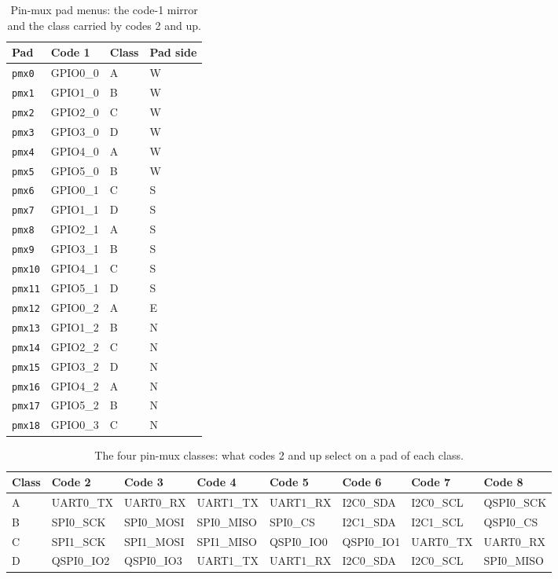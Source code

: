 \begin{table}[htbp]
	\centering
	\caption{Pin-mux pad menus: the code-1 mirror and the class carried by codes 2 and up.}
	\begin{tabular}{llll}
		\toprule
		Pad & Code 1 & Class & Pad side \\
		\midrule
		\texttt{pmx0} & GPIO0\_0 & A & W \\
		\texttt{pmx1} & GPIO1\_0 & B & W \\
		\texttt{pmx2} & GPIO2\_0 & C & W \\
		\texttt{pmx3} & GPIO3\_0 & D & W \\
		\texttt{pmx4} & GPIO4\_0 & A & W \\
		\texttt{pmx5} & GPIO5\_0 & B & W \\
		\texttt{pmx6} & GPIO0\_1 & C & S \\
		\texttt{pmx7} & GPIO1\_1 & D & S \\
		\texttt{pmx8} & GPIO2\_1 & A & S \\
		\texttt{pmx9} & GPIO3\_1 & B & S \\
		\texttt{pmx10} & GPIO4\_1 & C & S \\
		\texttt{pmx11} & GPIO5\_1 & D & S \\
		\texttt{pmx12} & GPIO0\_2 & A & E \\
		\texttt{pmx13} & GPIO1\_2 & B & N \\
		\texttt{pmx14} & GPIO2\_2 & C & N \\
		\texttt{pmx15} & GPIO3\_2 & D & N \\
		\texttt{pmx16} & GPIO4\_2 & A & N \\
		\texttt{pmx17} & GPIO5\_2 & B & N \\
		\texttt{pmx18} & GPIO0\_3 & C & N \\
		\bottomrule
	\end{tabular}
\end{table}

\begin{table}[htbp]
	\centering
	\caption{The four pin-mux classes: what codes 2 and up select on a pad of each class.}
	\begin{tabular}{llllllll}
		\toprule
		Class & Code 2 & Code 3 & Code 4 & Code 5 & Code 6 & Code 7 & Code 8 \\
		\midrule
		A & UART0\_TX & UART0\_RX & UART1\_TX & UART1\_RX & I2C0\_SDA & I2C0\_SCL & QSPI0\_SCK \\
		B & SPI0\_SCK & SPI0\_MOSI & SPI0\_MISO & SPI0\_CS & I2C1\_SDA & I2C1\_SCL & QSPI0\_CS \\
		C & SPI1\_SCK & SPI1\_MOSI & SPI1\_MISO & QSPI0\_IO0 & QSPI0\_IO1 & UART0\_TX & UART0\_RX \\
		D & QSPI0\_IO2 & QSPI0\_IO3 & UART1\_TX & UART1\_RX & I2C0\_SDA & I2C0\_SCL & SPI0\_MISO \\
		\bottomrule
	\end{tabular}
\end{table}
